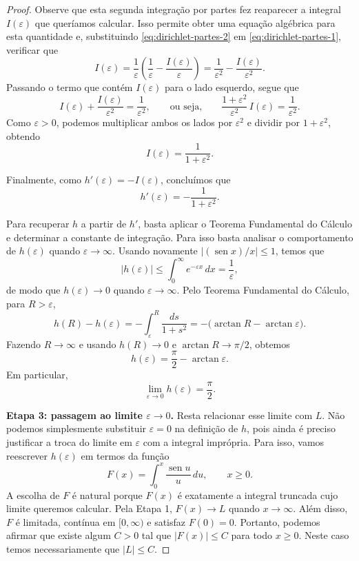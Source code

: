 \documentclass[12pt,portuguese]{article}
\theoremstyle{definition}
\theoremstyle{plainexercise}
\theoremstyle{starredexercise}
\theoremstyle{definition}
\renewcommand{\sin}{\operatorname{sen}}
\begin{document}
\begin{proof}
\smallskip
Observe que esta segunda integração por partes fez reaparecer a integral $I(\varepsilon)$
que queríamos calcular. Isso permite obter uma equação algébrica para esta quantidade e,
substituindo \eqref{eq:dirichlet-partes-2} em
\eqref{eq:dirichlet-partes-1}, verificar que
\[
I(\varepsilon)
=
\frac{1}{\varepsilon}
\left(\frac{1}{\varepsilon}-\frac{I(\varepsilon)}{\varepsilon}\right)
=
\frac{1}{\varepsilon^2}-\frac{I(\varepsilon)}{\varepsilon^2}.
\]
Passando o termo que contém $I(\varepsilon)$ para o lado esquerdo, segue que
\[
I(\varepsilon)+\frac{I(\varepsilon)}{\varepsilon^2}
=\frac{1}{\varepsilon^2},
\qquad\text{ou seja,}\qquad
\frac{1+\varepsilon^2}{\varepsilon^2}\,I(\varepsilon)
=\frac{1}{\varepsilon^2}.
\]
Como $\varepsilon>0$, podemos multiplicar ambos os lados por $\varepsilon^2$
e dividir por $1+\varepsilon^2$, obtendo
\[
I(\varepsilon)=\frac{1}{1+\varepsilon^2}.
\]

Finalmente, como $h'(\varepsilon)=-I(\varepsilon)$, concluímos que
\[
h'(\varepsilon)=-\frac{1}{1+\varepsilon^2}.
\]

Para recuperar $h$ a partir de $h'$, basta aplicar o Teorema Fundamental do Cálculo
e determinar a constante de integração. Para isso basta analisar o comportamento de $h(\varepsilon)$
quando $\varepsilon\to\infty$. Usando novamente $|(\sin x)/x|\leqslant1$, temos que
\[
|h(\varepsilon)|
\leqslant
\int_0^\infty e^{-\varepsilon x}\,dx
=\frac{1}{\varepsilon},
\]
de modo que $h(\varepsilon)\to0$ quando $\varepsilon\to\infty$.
Pelo Teorema Fundamental do Cálculo, para
$R>\varepsilon$,
\[
h(R)-h(\varepsilon)
=
-\int_\varepsilon^R\frac{ds}{1+s^2}
=
-\bigl(\arctan R-\arctan\varepsilon\bigr).
\]
Fazendo $R\to\infty$ e usando $h(R)\to0$ e
$\arctan R\to\pi/2$, obtemos
\[
h(\varepsilon)=\frac{\pi}{2}-\arctan\varepsilon .
\]
Em particular,
\begin{equation}\label{eq:dirichlet-regularizada}
\lim_{\varepsilon\to0}h(\varepsilon)=\frac{\pi}{2}.
\end{equation}

\smallskip
\noindent\textbf{Etapa 3: passagem ao limite $\varepsilon\to0$.}
Resta relacionar esse limite com $L$. Não podemos simplesmente substituir
$\varepsilon=0$ na definição de $h$, pois ainda é preciso justificar a troca
do limite em $\varepsilon$ com a integral imprópria. Para isso, vamos
reescrever $h(\varepsilon)$ em termos da função
\[
F(x)=\int_0^x\frac{\sin u}{u}\,du,\qquad x\geqslant0 .
\]
A escolha de $F$ é natural porque $F(x)$ é exatamente a integral truncada
cujo limite queremos calcular. Pela Etapa 1, $F(x)\to L$ quando
$x\to\infty$. Além disso, $F$ é limitada, contínua em $[0,\infty)$ e satisfaz $F(0)=0$. 
Portanto, podemos afirmar que existe algum $C>0$ tal que $|F(x)|\leqslant C$ para todo
$x\geqslant0$. Neste caso temos necessariamente que $|L|\leqslant C$.


\end{proof}
\end{document}
